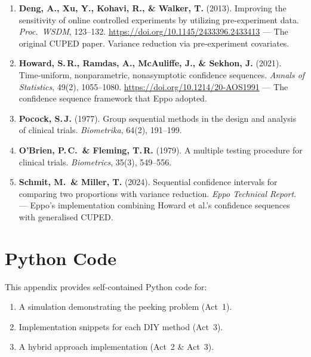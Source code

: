 \documentclass[12pt, a4paper]{article}
\begin{document}
\begin{enumerate}
  \item \textbf{Deng, A., Xu, Y., Kohavi, R., \& Walker, T.} (2013).
        Improving the sensitivity of online controlled experiments by
        utilizing pre-experiment data.
        \textit{Proc.\ WSDM}, 123--132.
        \url{https://doi.org/10.1145/2433396.2433413}
        --- The original CUPED paper.  Variance reduction via pre-experiment
        covariates.

  \item \textbf{Howard, S.\,R., Ramdas, A., McAuliffe, J., \& Sekhon, J.}
        (2021).
        Time-uniform, nonparametric, nonasymptotic confidence sequences.
        \textit{Annals of Statistics}, 49(2), 1055--1080.
        \url{https://doi.org/10.1214/20-AOS1991}
        --- The confidence sequence framework that Eppo adopted.

  \item \textbf{Pocock, S.\,J.} (1977).
        Group sequential methods in the design and analysis of clinical
        trials.
        \textit{Biometrika}, 64(2), 191--199.

  \item \textbf{O'Brien, P.\,C.\ \& Fleming, T.\,R.} (1979).
        A multiple testing procedure for clinical trials.
        \textit{Biometrics}, 35(3), 549--556.

  \item \textbf{Schmit, M.\ \& Miller, T.} (2024).
        Sequential confidence intervals for comparing two proportions with
        variance reduction.
        \textit{Eppo Technical Report}.
        --- Eppo's implementation combining Howard et al.'s confidence
        sequences with generalised CUPED.
\end{enumerate}


\newpage
\appendix
\section{Python Code}

This appendix provides self-contained Python code for:
\begin{enumerate}[nosep]
  \item A simulation demonstrating the peeking problem (Act~1).
  \item Implementation snippets for each DIY method (Act~3).
  \item A hybrid approach implementation (Act~2 \& Act~3).
\end{enumerate}
\end{document}
